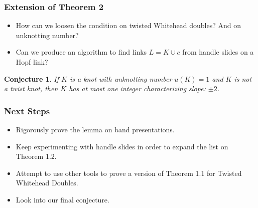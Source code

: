 \documentclass{beamer}
\newtheorem{conjecture}[theorem]{Conjecture}
\theoremstyle{ex}
\theoremstyle{rem}
\begin{document}
\begin{frame}
	\frametitle{Extension of Theorem 2}
	\begin{itemize}
		\item How can we loosen the condition on twisted Whitehead doubles? And on unknotting number?
		\item Can we produce an algorithm to find links $L = K \cup c$ from handle slides on a Hopf link?
	\end{itemize}
	\begin{conjecture}
		If $K$ is a knot with unknotting number $u(K) = 1$ and $K$ is not a twist knot, then $K$ has at most \textit{one} integer characterizing slope: $\pm 2$.
	\end{conjecture}
\end{frame}

\begin{frame}
	\frametitle{Next Steps}
	\begin{itemize}
		\item Rigorously prove the lemma on band presentations.
		\item Keep experimenting with handle slides in order to expand the list on Theorem 1.2.
		\item Attempt to use other tools to prove a version of Theorem 1.1 for Twisted Whitehead Doubles.
		\item Look into our final conjecture.
	\end{itemize}
\end{frame}
\end{document}
